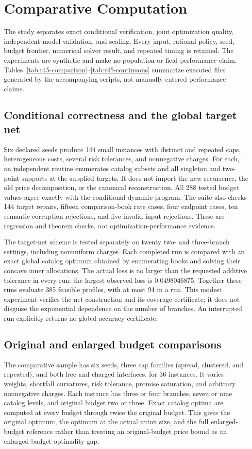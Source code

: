 \section{Comparative Computation}\label{sec:r45-study}
The study separates exact conditional verification, joint optimization quality, independent model validation, and scaling. Every input, rational policy, seed, budget frontier, numerical solver result, and repeated timing is retained. The experiments are synthetic and make no population or field-performance claim. Tables~\ref{tab:r45-comparison}--\ref{tab:r45-continuous} summarize executed files generated by the accompanying scripts, not manually entered performance claims.

\subsection{Conditional correctness and the global target net}
Six declared seeds produce 144 small instances with distinct and repeated caps, heterogeneous costs, several risk tolerances, and nonnegative charges. For each, an independent routine enumerates catalog subsets and all singleton and two-point supports at the supplied targets. It does not import the new recurrence, the old price decomposition, or the canonical reconstruction. All 288 tested budget values agree exactly with the conditional dynamic program. The suite also checks 144 target repairs, fifteen comparison-book rate cases, four endpoint cases, ten semantic corruption rejections, and five invalid-input rejections. These are regression and theorem checks, not optimization-performance evidence.

The target-net scheme is tested separately on twenty two- and three-branch settings, including nonuniform charges. Each completed run is compared with an exact global catalog optimum obtained by enumerating books and solving their concave inner allocations. The actual loss is no larger than the requested additive tolerance in every run; the largest observed loss is $0.0498046875$. Together these runs evaluate 385 feasible profiles, with at most 94 in a run. This modest experiment verifies the net construction and its coverage certificate; it does not disguise the exponential dependence on the number of branches. An interrupted run explicitly returns no global accuracy certificate.

\subsection{Original and enlarged budget comparisons}
The comparative sample has six seeds, three cap families (spread, clustered, and repeated), and both free and charged interfaces, for 36 instances. It varies weights, shortfall curvatures, risk tolerance, promise saturation, and arbitrary nonnegative charges. Each instance has three or four branches, seven or nine catalog levels, and original budget two or three. Exact catalog optima are computed at every budget through twice the original budget. This gives the original optimum, the optimum at the actual union size, and the full enlarged-budget reference rather than treating an original-budget price bound as an enlarged-budget optimality gap.

